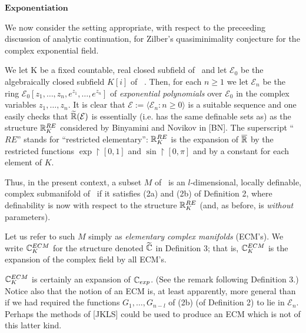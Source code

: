\documentclass[12pt,nodate]{article}
\begin{document}
 \vspace{5mm}
 
 \noindent
 $\mathbf{Exponentiation}$
 
 \vspace{2mm}
 
 We now consider the setting appropriate, with respect to the preceeding discussion of analytic continuation, for Zilber's quasiminimality conjecture for the complex exponential field.
 
 \vspace{1mm}
 
 We let K be a fixed countable, real closed subfield of \R\  and let $\mathcal{E}_0$ be the algebraically closed subfield $K[i]$ of \C\ . Then, for each $n \geq 1$ we let $\mathcal{E}_n$ be the ring $\mathcal{E}_0 [ z_1 ,  \ldots , z_n , e^{z_1} , \ldots , e^{z_n} ]$ of \emph{exponential polynomials} over $\mathcal{E}_0$ in the complex variables $z_1 ,  \ldots , z_n$. It is clear that $\mathcal{E} := \langle 
 \mathcal{E}_n : n \geq 0 \rangle$ is a suitable sequence and one easily checks that $\widetilde{\mathbb{R}} ( \mathcal{E} )$ is essentially (i.e. has the same definable sets as) as the structure   $\mathbb{R}^{RE}_{K}$ considered by Binyamini and Novikov in [BN]. The superscript  ``$RE$'' stands for ``restricted elementary'':  $\mathbb{R}^{RE}_{K}$ is the expansion of $\overline{\mathbb{R}}$ by  the restricted functions $\exp$$\upharpoonright$$[0, 1]$ and $\sin$$\upharpoonright$$[0, \pi ]$ and by a constant for each element of  $K$.

 \vspace{1mm}
 
 Thus, in the present context, a subset $M$ of \Cn\  is an $l$-dimensional, locally definable, complex submanifold of \Cn\  if it satisfies (2a) and (2b) of Definition 2, where definability is now with respect to the structure  $\mathbb{R}^{RE}_{K}$ (and, as before, is \emph{without} parameters).
 
 \vspace{1mm}
 
 Let us refer to such $M$ simply as \emph{elementary complex manifolds} (ECM's). We write $\mathbb{C}^{ECM}_{K}$ for the structure denoted $\widetilde{\mathbb{C}}$ in Definition 3; that is, $\mathbb{C}^{ECM}_{K}$ is the expansion of the complex field by all ECM's.
 
 $\mathbb{C}^{ECM}_{K}$ is certainly an expansion of $\mathbb{C}_{exp}$. (See the remark following Definition 3.)
 Notice also that the notion of an ECM is, at least apparently, more general than if we had required the functions $G_1 , \ldots , G_{n-l}$ of (2b) (of Definition 2) to lie in $\mathcal{E}_n$. Perhaps the methods of [JKLS] could be used to produce an ECM which is not of this latter kind.
 
\end{document}
